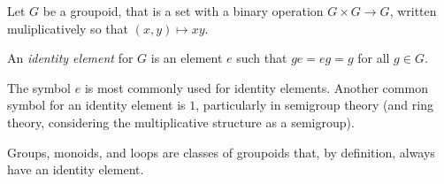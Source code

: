 \documentclass[12pt]{article}
\begin{document}

Let $G$ be a groupoid, that is a set with a binary operation $G \times G \to G$, written muliplicatively so that $(x, y) \mapsto xy$.

An \emph{identity element} for $G$ is an element $e$ such that $ge = eg = g$ for all $g \in G$.

The symbol $e$ is most commonly used for identity elements.  Another  common symbol for an identity element is $1$, particularly in semigroup theory (and ring theory, considering the multiplicative structure as a semigroup).

Groups, monoids, and loops are classes of groupoids that, by definition, always have an identity element.
\end{document}
